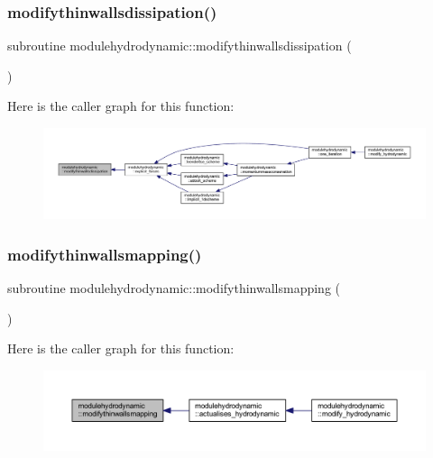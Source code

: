 \subsubsection{\texorpdfstring{modifythinwallsdissipation()}{modifythinwallsdissipation()}}
{\footnotesize\ttfamily subroutine modulehydrodynamic\+::modifythinwallsdissipation (\begin{DoxyParamCaption}{ }\end{DoxyParamCaption})\hspace{0.3cm}{\ttfamily [private]}}

Here is the caller graph for this function\+:\nopagebreak
\begin{figure}[H]
\begin{center}
\leavevmode
\includegraphics[width=350pt]{namespacemodulehydrodynamic_ae798ddafe12ad94cd6148f8e2658f074_icgraph}
\end{center}
\end{figure}
\mbox{\label{namespacemodulehydrodynamic_a70e1f2e2a0b5b92df6a6003db5b51b60}} 
\subsubsection{\texorpdfstring{modifythinwallsmapping()}{modifythinwallsmapping()}}
{\footnotesize\ttfamily subroutine modulehydrodynamic\+::modifythinwallsmapping (\begin{DoxyParamCaption}{ }\end{DoxyParamCaption})\hspace{0.3cm}{\ttfamily [private]}}

Here is the caller graph for this function\+:\nopagebreak
\begin{figure}[H]
\begin{center}
\leavevmode
\includegraphics[width=350pt]{namespacemodulehydrodynamic_a70e1f2e2a0b5b92df6a6003db5b51b60_icgraph}
\end{center}
\end{figure}
\mbox{\label{namespacemodulehydrodynamic_af96ad695325003d3a6068df53933c723}} 

